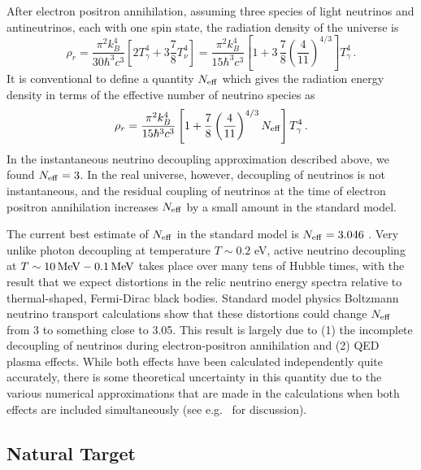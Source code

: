 After electron positron annihilation, assuming three species of light neutrinos and antineutrinos, each with one spin state, the radiation density of the universe is
\begin{equation}
	\rho_r = \frac{\pi^2k_B^4}{30\hbar^3 c^3}\left[2T_\gamma^4 + 3\frac{7}{8}T_\nu^4\right] = \frac{\pi^2k_B^4}{15\hbar^3 c^3}\left[1+3\,\frac{7}{8}\left(\frac{4}{11}\right)^{4/3}\right] T_\gamma^4 \, .
\end{equation}
It is conventional to define a quantity $N_{\rm eff}$ which gives the radiation energy density in terms of the effective number of neutrino species as
\begin{equation}
	\rho_r = \frac{\pi^2k_B^4}{15\hbar^3 c^3}\left[1+\frac{7}{8}\left(\frac{4}{11}\right)^{4/3}N_{\rm eff}\right] T_\gamma^4 \, .
\end{equation}
In the instantaneous neutrino decoupling approximation described above, we found $N_{\rm eff} = 3$.  In the real universe, however, decoupling of neutrinos is not instantaneous, and the residual coupling of neutrinos at the time of electron positron annihilation increases $N_{\rm eff}$ by a small amount in the standard model.

The current best estimate of $N_{\rm eff}$ in the standard model is $N_{\rm eff} = 3.046$ \cite{Mangano:2005cc}.   Very unlike photon decoupling at temperature $T \sim 0.2$ eV, active neutrino decoupling at $T \sim 10 \, {\rm MeV} - 0.1 \, {\rm MeV}$ takes place over many tens of Hubble times, with the result that we expect distortions in the relic neutrino energy spectra relative to thermal-shaped, Fermi-Dirac black bodies. Standard model physics Boltzmann neutrino transport calculations show that these distortions could change $N_{\rm eff}$ from 3 to something close to 3.05. This result is largely due to (1) the incomplete decoupling of neutrinos during electron-positron annihilation and (2) QED plasma effects.  While both effects have been calculated independently quite accurately, there is some theoretical uncertainty in this quantity due to the various numerical approximations that are made in the calculations when both effects are included simultaneously (see e.g.~\cite{Grohs:2015tfy} for discussion).  








\subsection{Natural Target}

